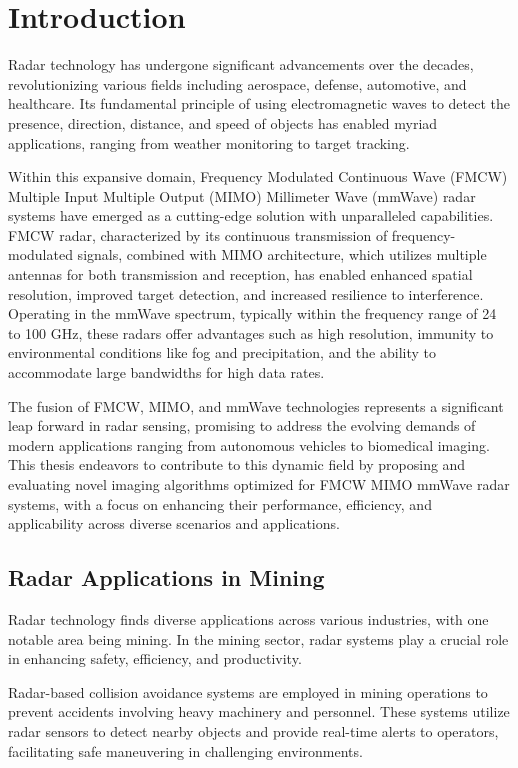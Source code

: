 \chapter{Introduction}
\label{ch:intro}
Radar technology has undergone significant advancements over the decades,
revolutionizing various fields including aerospace, defense, automotive, and healthcare.
Its fundamental principle of using electromagnetic waves to detect the presence,
direction, distance, and speed of objects has enabled myriad applications, ranging from weather monitoring to target tracking.

Within this expansive domain, Frequency Modulated Continuous Wave (FMCW)
Multiple Input Multiple Output (MIMO) Millimeter Wave (mmWave) radar systems have emerged
as a cutting-edge solution with unparalleled capabilities.
FMCW radar, characterized by its continuous transmission of frequency-modulated signals,
combined with MIMO architecture, which utilizes multiple antennas for both transmission and reception,
has enabled enhanced spatial resolution, improved target detection, and increased resilience to interference.
Operating in the mmWave spectrum, typically within the frequency range of 24 to 100 GHz,
these radars offer advantages such as high resolution, immunity to environmental conditions
like fog and precipitation, and the ability to accommodate large bandwidths for high data rates.

The fusion of FMCW, MIMO, and mmWave technologies represents a significant leap forward in radar sensing,
promising to address the evolving demands of modern applications ranging from autonomous vehicles to biomedical imaging.
This thesis endeavors to contribute to this dynamic field by proposing and evaluating
novel imaging algorithms optimized for FMCW MIMO mmWave radar systems, with a focus on
enhancing their performance, efficiency, and applicability across diverse scenarios and applications. \\

\section{Radar Applications in Mining}
Radar technology finds diverse applications across various industries, with one notable area being mining.
In the mining sector, radar systems play a crucial role in enhancing safety, efficiency, and productivity.

Radar-based collision avoidance systems are employed in mining operations to prevent accidents involving heavy machinery and personnel.
These systems utilize radar sensors to detect nearby objects and provide real-time alerts to operators,
facilitating safe maneuvering in challenging environments.

